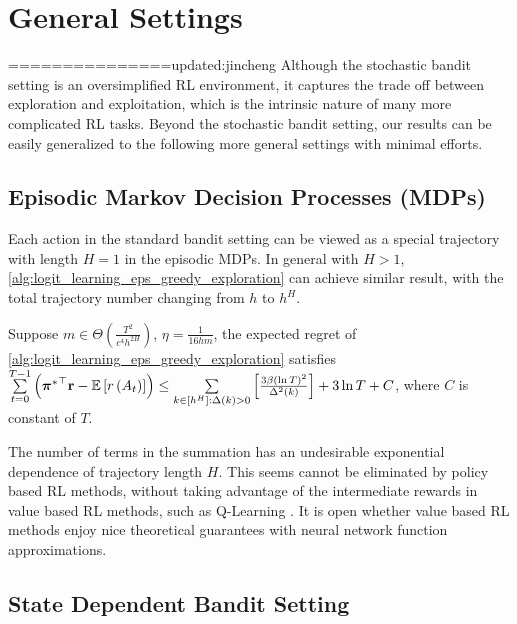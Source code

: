 \section{General Settings}
\label{sec:general_settings}

===============updated:jincheng
Although the stochastic bandit setting is an oversimplified RL environment, it captures the trade off between exploration and exploitation, which is the intrinsic nature of many more complicated RL tasks. Beyond the stochastic bandit setting, our results can be easily generalized to the following more general settings with minimal efforts.

\subsection{Episodic Markov Decision Processes (MDPs)}

Each action in the standard bandit setting can be viewed as a special trajectory with length $H = 1$ in the episodic MDPs. In general with $H > 1$, \cref{alg:logit_learning_eps_greedy_exploration} can achieve similar result, with the total trajectory number changing from $h$ to $h^H$.
\begin{thm}
\label{thm:episodic_mdp_setting}
     Suppose $m \in \Theta\left( \frac{T^2}{c^4 h^{2H}} \right)$, $\eta = \frac{ 1 }{16 h m}$, the expected regret of \cref{alg:logit_learning_eps_greedy_exploration} satisfies $\sum\limits_{t=0}^{T-1}{ \left( {{\boldsymbol{\pi}}^*}^\top {\mathbf{r}} - {\mathbb{E}} \left[ r\left(A_t\right) \right] \right) } \le \sum\limits_{k \in [h^H] : \Delta(k) > 0}{ \left[ \frac{ 3 \beta \left( \ln{T} \right)^2}{\Delta^2(k)} \right] } + 3 \ln{T} + C$, where $C$ is constant of $T$.
\end{thm}

The number of terms in the summation has an undesirable exponential dependence of trajectory length $H$. This seems cannot be eliminated by policy based RL methods, without taking advantage of the intermediate rewards in value based RL methods, such as Q-Learning \citep{jin2018q}. It is open whether value based RL methods enjoy nice theoretical guarantees with neural network function approximations.

\subsection{State Dependent Bandit Setting}

